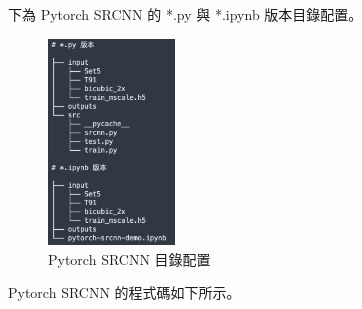 \documentclass[11pt,UTF8]{ctexart}
\begin{document}
下為 Pytorch SRCNN 的 *.py 與 *.ipynb 版本目錄配置。

\begin{figure}[H]
\centering 
\includegraphics[width=0.30\textwidth]{s1.png} 
\caption{Pytorch SRCNN 目錄配置}
\label{Test}
\end{figure}


Pytorch SRCNN 的程式碼如下所示。
\end{document}
